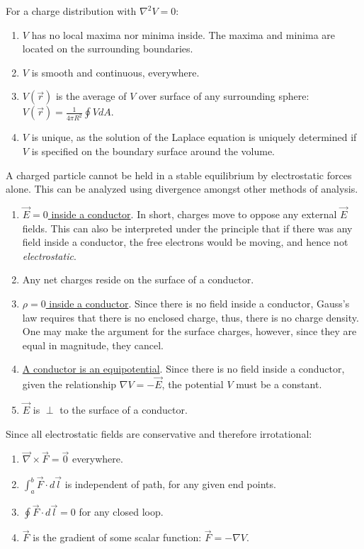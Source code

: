 \documentclass{article}
\newcommand{\formbox}[2]{\begin{center} \begin{tcolorbox}[title = #1, boxrule=2pt,arc=3.4pt,boxsep=0mm] #2\end{tcolorbox}\end{center}}
\begin{document}
\begin{multicols*}{3}
\formbox{Uniqueness of Solutions}{
    For a charge distribution with $\nabla^2V = 0$:
    \begin{enumerate}
        \item $V$ has no local maxima nor minima inside. The maxima and minima are located
        on the surrounding boundaries.
        \item $V$ is smooth and continuous, everywhere.
        \item $V(\vec{r})$ is the average of $V$ over surface of any surrounding sphere:
        $V(\vec{r}) = \frac{1}{4\pi R^2}\oint VdA$.
        \item $V$ is unique, as the solution of the Laplace equation is uniquely determined
        if $V$ is specified on the boundary surface around the volume.
    \end{enumerate}
}

\formbox{Earnshaw's Theorem}{
A charged particle cannot be held in a stable equilibrium by electrostatic forces alone.
This can be analyzed using divergence amongst other methods of analysis.
}

\formbox{Properties of Conductors}{
    \begin{enumerate}
        \item \underline{$\vec{E} = 0$ inside a conductor}. In short, charges move to oppose any external $\vec{E}$ fields.
        This can also be interpreted under the principle that if there was any field inside
        a conductor, the free electrons would be moving, and hence not \textit{electrostatic}.
        \item Any net charges reside on the surface of a conductor.
        \item \underline{$\rho = 0$ inside a conductor}. Since there is no field inside a conductor,
        Gauss's law requires that there is no enclosed charge, thus, there is no charge density.
        One may make the argument for the surface charges, however, since they are equal in magnitude,
        they cancel.
        \item \underline{A conductor is an equipotential}. Since there is no field inside
        a conductor, given the relationship $\nabla V = -\vec{E}$, the potential $V$ must
        be a constant.
        \item $\vec{E}$ is $\perp$ to the surface of a conductor.
    \end{enumerate} 
}

\formbox{Rules for Irrotational Fields}{
    Since all electrostatic fields are conservative and therefore irrotational:
    \begin{enumerate}
        \item $\vec{\nabla} \times \vec{F} = \vec{0}$ everywhere.
        \item $\int_a^b\vec{F}\cdot d\vec{l}$ is independent of path, for any given end points.
        \item $\oint \vec{F}\cdot d\vec{l} = 0$ for any closed loop.
        \item $\vec{F}$ is the gradient of some scalar function: $\vec{F} = -\nabla V$.
    \end{enumerate}
}


\end{multicols*}
\end{document}
